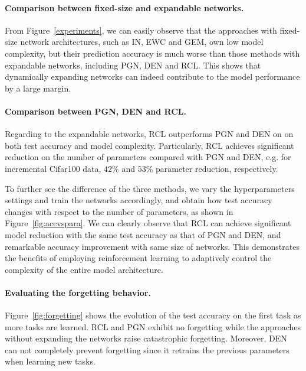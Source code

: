 \documentclass{article}
\begin{document}
\paragraph{Comparison between fixed-size and expandable networks.}
From Figure~\ref{experiments}, we can easily observe that the approaches with fixed-size network architectures, such as  IN, EWC and GEM, own low model complexity, but their prediction accuracy is much worse than those methods with expandable networks, including PGN, DEN and RCL. This shows that dynamically expanding networks can  indeed contribute to the model performance by a large margin.


\paragraph{Comparison between PGN, DEN and RCL.} Regarding to the expandable networks, RCL outperforms PGN and DEN on on both test accuracy and model complexity. Particularly, RCL achieves significant reduction on the number of parameters compared with PGN and DEN, e.g. for incremental Cifar100 data, $42\%$ and $53\%$ parameter reduction, respectively.

To further see the difference of the three methods, we vary the hyperparameters settings and train the networks accordingly, and obtain how test accuracy changes with respect to the number of parameters, as shown in Figure~\ref{fig:accvspara}. We can clearly observe that RCL can achieve significant model reduction with the same test accuracy as that of PGN and DEN, and remarkable accuracy improvement with same size of networks.
This demonstrates the benefits of employing reinforcement learning to adaptively control the complexity of the entire model architecture.


\paragraph{Evaluating the forgetting behavior.}
Figure~\ref{fig:forgetting} shows the evolution of the test accuracy on the first task as more tasks are learned. RCL and PGN exhibit no forgetting while the approaches without expanding the networks raise catastrophic forgetting. Moreover, DEN can not completely prevent forgetting since it retrains the previous parameters when learning new tasks.
\end{document}
